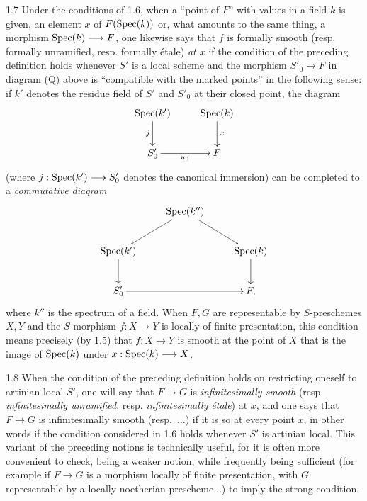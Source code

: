 \begin{remark}{1.7}\label{XI.1.7}
Under the conditions of 1.6, when a ``point of $F$'' with values in a field $k$ is given, \ie an element $x$ of $F(\operatorname{Spec}(k))$ or, what amounts to the same thing, a morphism $\operatorname{Spec}(k)\longrightarrow F$, one likewise says that $f$ is formally smooth (resp. formally unramified, resp. formally étale) \emph{at $x$} if the condition of the preceding definition holds whenever $S'$ is a local scheme and the morphism $S'_0\to F$ in diagram (Q) above is ``compatible with the marked points'' in the following sense: if $k'$ denotes the residue field of $S'$ and $S'_0$ at their closed point, the diagram
\[
\xymatrix{\Spec(k')\ar[d]_j&\Spec(k)\ar[d]^x\\S'_0\ar[r]_{u_0}&F}
\]
(where $j:\operatorname{Spec}(k')\longrightarrow S'_0$ denotes the canonical immersion) can be completed to a \emph{commutative diagram}
\[
\xymatrix{&\Spec(k'')\ar[dl]\ar[dr]&\\\Spec(k')\ar[d]&&\Spec(k)\ar[d]\\S'_0\ar[rr]&&F,}
\]
where $k''$ is the spectrum of a field. When $F,G$ are representable by $S$-preschemes $X,Y$ and the $S$-morphism $f:X\to Y$ is locally of finite presentation, this condition means precisely (by 1.5) that $f:X\to Y$ is smooth at the point of $X$ that is the image of $\operatorname{Spec}(k)$ under $x:\operatorname{Spec}(k)\longrightarrow X$.
\end{remark}

\begin{remark}{1.8}\label{XI.1.8}
When the condition of the preceding definition holds on restricting oneself to artinian local $S'$, one will say that $F\to G$ is \emph{infinitesimally smooth} (resp. \emph{infinitesimally unramified}, resp. \emph{infinitesimally étale}) at $x$, and one says that $F\to G$ is infinitesimally smooth (resp.\ $\ldots$) if it is so at every point $x$, in other words if the condition considered in 1.6 holds whenever $S'$ is artinian local. This variant of the preceding notions is technically useful, for it is often more convenient to check, being a weaker notion, while frequently being sufficient (for example if $F\to G$ is a morphism locally of finite presentation, with $G$ representable by a locally noetherian prescheme$\ldots$) to imply the strong condition.
\end{remark}

